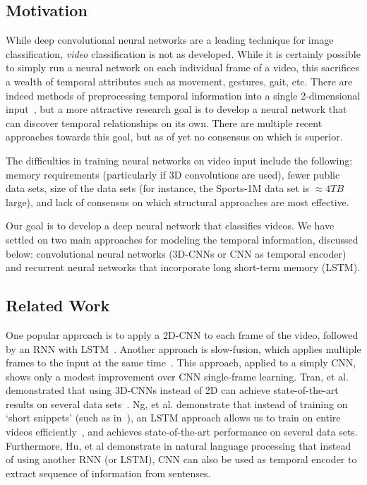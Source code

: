 \subsection*{Motivation}
While deep convolutional neural networks are a leading technique for image classification, \emph{video} classification is not as developed.
While it is certainly possible to simply run a neural network on each individual frame of a video, this sacrifices a wealth of temporal attributes such as movement, gestures, gait, etc.
There are indeed methods of preprocessing temporal information into a single 2-dimensional input~\cite{brox}, but a more attractive research goal is to develop a neural network that can discover temporal relationships on its own.
There are multiple recent approaches towards this goal, but as of yet no consensus on which is superior.

The difficulties in training neural networks on video input include the following: memory requirements (particularly if 3D convolutions are used), fewer public data sets, size of the data sets (for instance, the Sports-1M data set is $\approx 4TB$ large), and lack of consensus on which structural approaches are most effective. 

Our goal is to develop a deep neural network that classifies videos.
We have settled on two main approaches for modeling the temporal information, discussed below: convolutional neural networks (3D-CNNs or CNN as temporal encoder) and recurrent neural networks that incorporate long short-term memory (LSTM).  

\subsection*{Related Work}

One popular approach is to apply a 2D-CNN to each frame of the video, followed by an RNN with LSTM~\cite{ltrcn}. 
Another approach is slow-fusion, which applies multiple frames to the input at the same time~\cite{cnnvid}. This approach, applied to a simply CNN, shows only a modest improvement over CNN single-frame learning.
Tran, et al. demonstrated that using 3D-CNNs instead of 2D can achieve state-of-the-art results on several data sets~\cite{stf}.
Ng, et al. demonstrate that instead of training on `short snippets' (such as in~\cite{cnnvid,stf}), an LSTM approach allows us to train on entire videos efficiently~\cite{snip}, and achieves state-of-the-art performance on several data sets. Furthermore, Hu, et al \cite{cnnMNLS} demonstrate in natural language processing that instead of using another RNN (or LSTM), CNN can also be used as temporal encoder to extract sequence of information from sentenses. 

